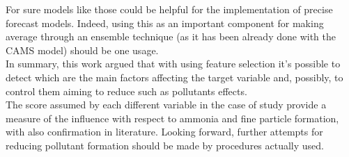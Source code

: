 For sure models like those could be helpful for the implementation of precise forecast models. Indeed, using this as an important component for making average through an ensemble technique (as it has been already done with the CAMS model) should be one usage.
\\
In summary, this work argued that with using feature selection it's possible to detect which are the main factors affecting the target variable and, possibly, to control them aiming to reduce such as pollutants effects.\\
The score assumed by each different variable in the case of study provide a measure of the influence with respect to ammonia and fine particle formation, with also confirmation in literature.
Looking forward, further attempts for reducing pollutant formation should be made by procedures actually used.

